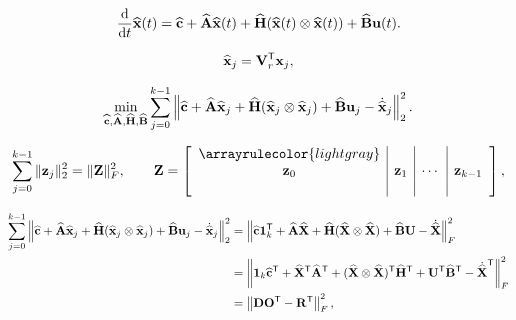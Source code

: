\documentclass[12 pt]{article}
\begin{document}
\begin{align*}
    \ddt\xrom(t)
    = \crom
    + \Arom\xrom(t)
    + \Hrom(\xrom(t)\otimes\xrom(t))
    + \Brom\ufom(t).
\end{align*}

\begin{align*}
    \xrom_{j} = \Vr\trp\xfom_{j},
\end{align*}

\begin{align*}
    \min_{\crom,\Arom,\Hrom,\Brom}\sum_{j=0}^{k-1}\left\|
      \crom
    + \Arom\xrom_j
    + \Hrom(\xrom_j\otimes\xrom_j)
    + \Brom\ufom_j
    - \dxrom_j
    \right\|_2^2.
\end{align*}

\begin{align*}
    \sum_{j=0}^{k-1}\|\mathbf{z}_j\|_2^2
    = \|\mathbf{Z}\|_F^2,
    \qquad
    \mathbf{Z}
    = \left[\begin{array}{c|c|c|c}\arrayrulecolor{lightgray}
        &&& \\
        \mathbf{z}_0 & \mathbf{z}_1 & \cdots & \mathbf{z}_{k-1} \\
        &&& \\
    \end{array}\right],
\end{align*}

\begin{align*}
    \sum_{j=0}^{k-1}\left\|
      \crom
    + \Arom\xrom_j
    + \Hrom(\xrom_j\otimes\xrom_j)
    + \Brom\ufom_j
    - \dxrom_j
    \right\|_2^2
    &=
    \left\|
      \crom\ones\trp
    + \Arom\Xrom
    + \Hrom(\Xrom\otimes\Xrom)
    + \Brom\Ufom
    - \dXrom
    \right\|_F^2
    \\
    &=
    \left\|
      \ones\crom\trp
    + \Xrom\trp\Arom\trp
    + (\Xrom\otimes\Xrom)\trp\Hrom\trp
    + \Ufom\trp\Brom\trp
    - \dXrom\trp
    \right\|_F^2
    \\
    &=
    \left\|\Data \Ops\trp - \Rhs\trp\right\|_F^2,
\end{align*}
\end{document}
